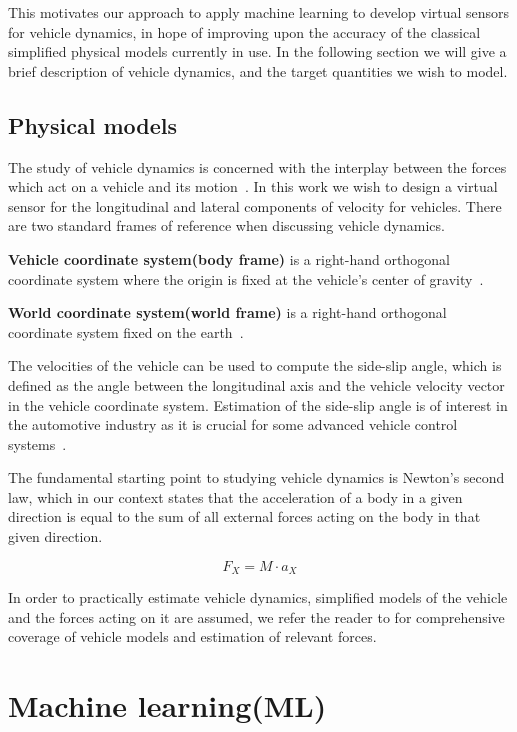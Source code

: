 \documentclass[../main.tex]{subfiles}
\begin{document}
This motivates our approach to apply machine learning to develop virtual sensors for vehicle dynamics, in hope of improving upon the accuracy of the classical simplified physical models currently in use. In the following section we will give a brief description of vehicle dynamics, and the target quantities we wish to model. 

\subsection{Physical models}
\label{sec:vehicle_dynamics}

The study of vehicle dynamics is concerned with the interplay between the forces which act on a vehicle and its motion~\citep{schramm2014vehicle}. In this work we wish to design a virtual sensor for the longitudinal and lateral components of velocity for vehicles. There are two standard frames of reference when discussing vehicle dynamics. 

\textbf{Vehicle coordinate system(body frame)} is a right-hand orthogonal coordinate system where the origin is fixed at the vehicle's center of gravity~\citep{gill2000vehicle}.

\textbf{World coordinate system(world frame)} is a right-hand orthogonal coordinate system fixed on the earth~\citep{gill2000vehicle}.

The velocities of the vehicle can be used to compute the side-slip angle, which is defined as the angle between the longitudinal axis and the vehicle velocity vector in the vehicle coordinate system. Estimation of the side-slip angle is of interest in the automotive industry as it is crucial for some advanced vehicle control systems~\citep{jin2017vehicle}. 

The fundamental starting point to studying vehicle dynamics is Newton's second law, which in our context states that the acceleration of a body in a given direction is equal to the sum of all external forces acting on the  body in that given direction. 

\begin{equation}
    F_X = M \cdot a_X
\end{equation}{}

In order to practically estimate vehicle dynamics, simplified models of the vehicle and the forces acting on it are assumed, we refer the reader to \cite{schramm2014vehicle} for comprehensive coverage of vehicle models and estimation of relevant forces.

\section{Machine learning(ML)}
\end{document}
